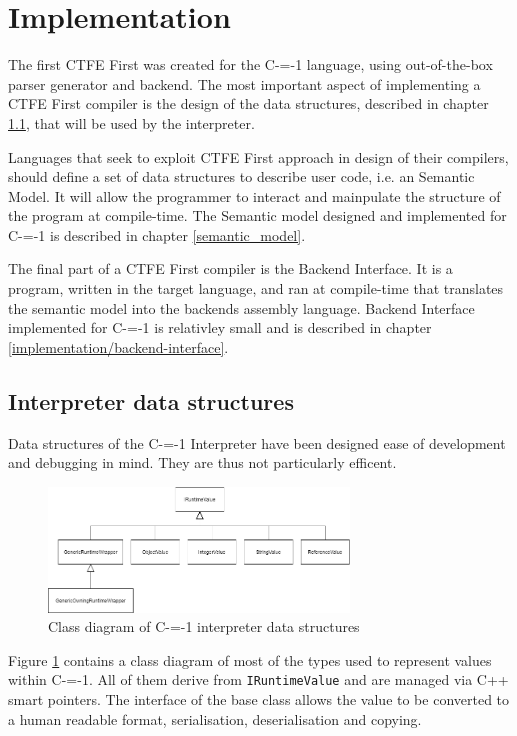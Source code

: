 \section{Implementation}
\label{implementation}

The first CTFE First was created for the C-=-1 language, using out-of-the-box parser generator and backend.
The most important aspect of implementing a CTFE First compiler is the design of the data structures, described in chapter \ref{data_structures}, that will be used by the interpreter.

Languages that seek to exploit CTFE First approach in design of their compilers, should define a set of data structures to describe user code, i.e. an Semantic Model.
It will allow the programmer to interact and mainpulate the structure of the program at compile-time.
The Semantic model designed and implemented for C-=-1 is described in chapter \ref{semantic_model}.

The final part of a CTFE First compiler is the Backend Interface.
It is a program, written in the target language, and ran at compile-time that translates the semantic model into the backends assembly language.
Backend Interface implemented for C-=-1 is relativley small and is described in chapter \ref{implementation/backend-interface}.

\subsection{Interpreter data structures}
\label{data_structures}
Data structures of the C-=-1 Interpreter have been designed ease of development and debugging in mind.
They are thus not particularly efficent.

\begin{figure}
	\includegraphics[width=8cm]{pictures/interpreter_data_structures_uml.png}
	\caption{Class diagram of C-=-1 interpreter data structures}
	\label{fig:interpreter_data_structures}
\end{figure}

Figure \ref{fig:interpreter_data_structures} contains a class diagram of most of the types used to represent values within C-=-1.
All of them derive from \lstinline{IRuntimeValue} and are managed via C++ smart pointers.
The interface of the base class allows the value to be converted to a human readable format, serialisation, deserialisation and copying.

